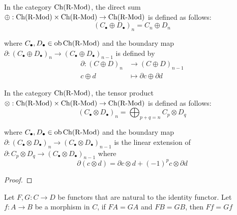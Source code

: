 \documentclass{article}
\begin{document}
\begin{definition}
    In the category $\operatorname{Ch}(\operatorname{R-Mod})$, the direct sum $\oplus: \operatorname{Ch}(\operatorname{R-Mod}) \times \operatorname{Ch}(\operatorname{R-Mod}) \to \operatorname{Ch}(\operatorname{R-Mod})$ is defined as follows:
    $$
        (C_\bullet \oplus D_\bullet)_n = C_n \oplus D_n
    $$

    where $C_\bullet, D_\bullet \in \operatorname{ob} \operatorname{Ch}(\operatorname{R-Mod})$ and the boundary map $\partial: (C_\bullet \oplus D_\bullet)_n \to (C_\bullet \oplus D_\bullet)_{n-1}$ is defined by
    \begin{align*}
        \partial:   (C \oplus D)_n &\to (C \oplus D)_{n-1} \\
                    c \oplus d &\mapsto \partial c \oplus \partial d
    \end{align*}
    
\end{definition}

\begin{definition}
    In the category $\operatorname{Ch}(\operatorname{R-Mod})$, the tensor product $\otimes: \operatorname{Ch}(\operatorname{R-Mod}) \times \operatorname{Ch}(\operatorname{R-Mod}) \to \operatorname{Ch}(\operatorname{R-Mod})$ is defined as follows:
    $$
        (C_\bullet \otimes D_\bullet)_n = \bigoplus_{p + q = n} C_p \otimes D_q
    $$
    
    where $C_\bullet, D_\bullet \in \operatorname{ob} \operatorname{Ch}(\operatorname{R-Mod})$ and the boundary map $\partial: (C_\bullet \otimes D_\bullet)_n \to (C_\bullet \otimes D_\bullet)_{n-1}$ is the linear extension of $\partial: C_p \otimes D_q \to (C_\bullet \otimes D_\bullet)_{n-1}$ where
    $$
        \partial (c \otimes d) = \partial c \otimes d + (-1)^{p} c \otimes \partial d
    $$
\end{definition}

\begin{proof}
\end{proof}

\begin{lemma}
    Let $F, G: C \to D$ be functors that are natural to the identity functor. Let $f: A \to B$ be a morphism in $C$, if $FA = GA$ and $FB = GB$, then $Ff = Gf$

    \begin{center}
    \end{center}
\end{lemma}
\end{document}
